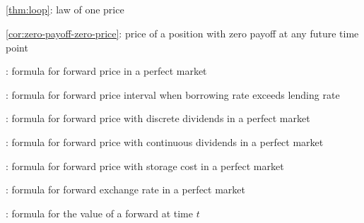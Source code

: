 \subsection*{}
\item \cref{thm:loop}: law of one price
\item \cref{cor:zero-payoff-zero-price}: price of a position with zero payoff at any
future time point
\item {}: formula for forward price in a perfect market
\item {}: formula for forward price interval when borrowing rate exceeds lending rate
\item {}: formula for forward price with discrete dividends in a perfect market
\item {}: formula for forward price with continuous dividends in a perfect market
\item {}: formula for forward price with storage cost in a perfect market
\item {}: formula for forward exchange rate in a perfect market
\item {}: formula for the value of a forward at time \(t\)
